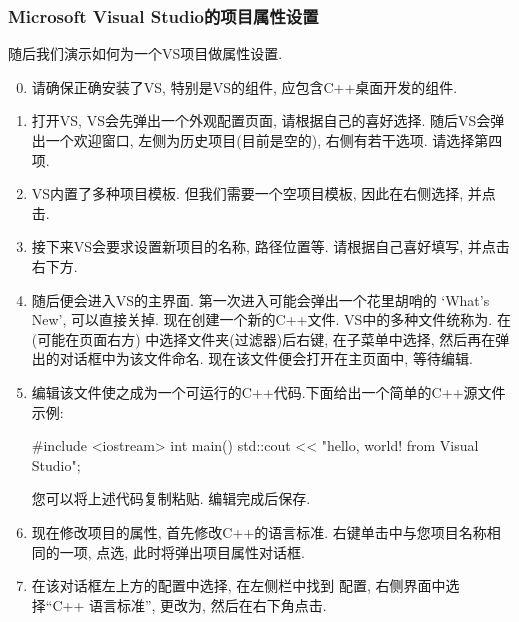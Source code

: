 \subsubsection{Microsoft Visual Studio的项目属性设置}
随后我们演示如何为一个VS项目做属性设置.
\begin{enumerate}
    \setcounter{enumi}{-1}
    \item 请确保正确安装了VS, 特别是VS的组件, 应包含C++桌面开发的组件.
    \item 打开VS, VS会先弹出一个外观配置页面, 请根据自己的喜好选择. 随后VS会弹出一个欢迎窗口, 左侧为历史项目(目前是空的), 右侧有若干选项. 请选择第四项{}.
    \item VS内置了多种项目模板. 但我们需要一个空项目模板, 因此在右侧选择{}, 并点击{}.
    \item 接下来VS会要求设置新项目的名称, 路径位置等. 请根据自己喜好填写, 并点击右下方{}.
    \item 随后便会进入VS的主界面. 第一次进入可能会弹出一个花里胡哨的 `What's New', 可以直接关掉.
          现在创建一个新的C++文件. VS中的多种文件统称为{}.
          在{} (可能在页面右方)
          中选择{}文件夹(过滤器)后右键,
          在{}子菜单中选择{}, 然后再在弹出的对话框中为该文件命名. 现在该文件便会打开在主页面中, 等待编辑.
    \item 编辑该文件使之成为一个可运行的C++代码.下面给出一个简单的C++源文件示例:
\begin{lcverbatim}
#include <iostream>
int main() {
        std::cout << "hello, world! from Visual Studio";
}
\end{lcverbatim}
          您可以将上述代码复制粘贴. 编辑完成后保存.
    \item 现在修改项目的属性, 首先修改C++的语言标准. 右键单击{}中与您项目名称相同的一项,
          点选{}, 此时将弹出项目属性对话框.
    \item 在该对话框左上方的配置中选择{}, 在左侧栏中找到
          配置{}, 右侧界面中选择``C++ 语言标准'',
          更改为{}, 然后在右下角点击{}.

\end{enumerate}
